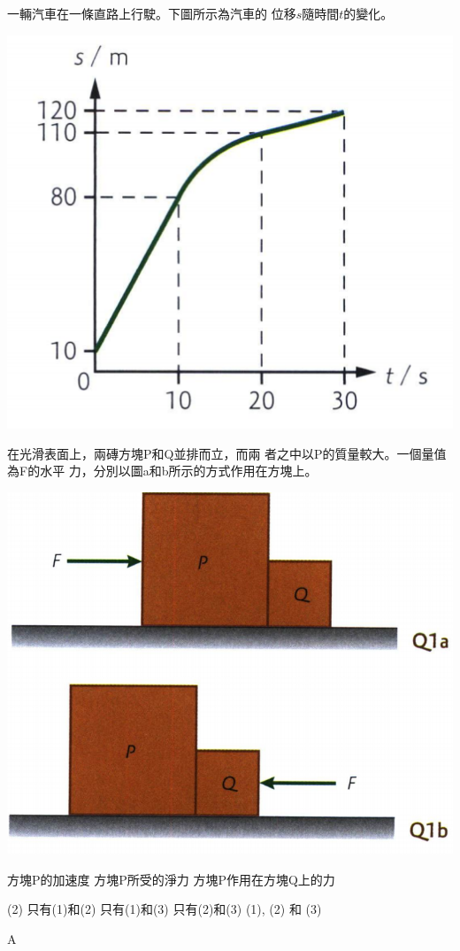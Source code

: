 {
    一輛汽車在一條直路上行駛。下圖所示為汽車的 位移$s$隨時間$t$的變化。
    \par{\par\centering\includegraphics[width=.5\textwidth]{./img/ch45prob_2024-05-10-15-17-53.png}\par}
}{}

{
    在光滑表面上，兩磚方塊P和Q並排而立，而兩 者之中以P的質量較大。一個量值為F的水平 力，分別以圖a和b所示的方式作用在方塊上。
    \par{\par\centering\includegraphics[width=.4\textwidth]{./img/ch45prob_2024-05-10-15-31-16.png}\par}
    \begin{statements}
        \task 方塊P的加速度
        \task  方塊P所受的淨力
        \task 方塊P作用在方塊Q上的力
    \end{statements}
    \begin{tasks}(2)
        \task 只有(1)和(2)
        \task 只有(1)和(3)
        \task 只有(2)和(3)
        \task (1), (2) 和 (3)
    \end{tasks}

}{A}

